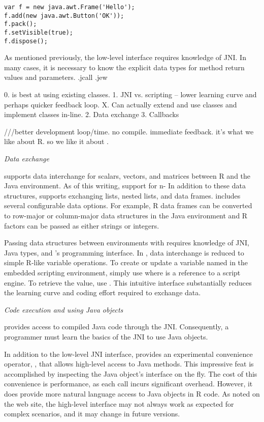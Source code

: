 \begin{verbatim}
var f = new java.awt.Frame('Hello');
f.add(new java.awt.Button('OK'));
f.pack();
f.setVisible(true);
f.dispose();
\end{verbatim}



As mentioned previously, the  low-level interface requires knowledge of JNI. In many cases, it is necessary to know the explicit data types for method return values and parameters.
.jcall
.jew




0.  is best at using existing classes.
1. JNI vs. scripting -- lower learning curve and perhaps quicker feedback loop.
X. Can actually extend and use classes and implement classes in-line.
2. Data exchange
3. Callbacks


///better development loop/time. no compile. immediate feedback. it's what we like about R. so we like it about .

\noindent \textit{Data exchange}

\noindent {} supports data interchange for scalars, vectors, and matrices between R and the Java environment. As of this writing,  support for n- In addition to these data structures,  supports exchanging lists, nested lists, and data frames.  includes several configurable data options. For example, R data frames can be converted to row-major or column-major data structures in the Java environment and R factors can be passed as either strings or integers.

Passing data structures between environments with  requires knowledge of JNI, Java types, and 's programming interface. In , data interchange is reduced to simple R-like variable operations. To create or update a variable named  in the embedded scripting environment, simply use  where  is a  reference to a script engine. To retrieve the value, use . This intuitive interface substantially reduces the learning curve and coding effort required to exchange data.

\noindent \textit{Code execution and using Java objects}

\noindent {} provides access to compiled Java code through the JNI. Consequently, a programmer must learn the basics of the JNI to use Java objects. 

In addition to the low-level JNI interface,  provides an experimental convenience operator, \code{\$}, that allows high-level access to Java methods. This impressive feat is accomplished by inspecting the Java object's interface on the fly. The cost of this convenience is performance, as each call incurs significant overhead. However, it does provide more natural language access to Java objects in R code. As noted on the  web site, the high-level interface may not always work as expected for complex scenarios, and it may change in future versions.


